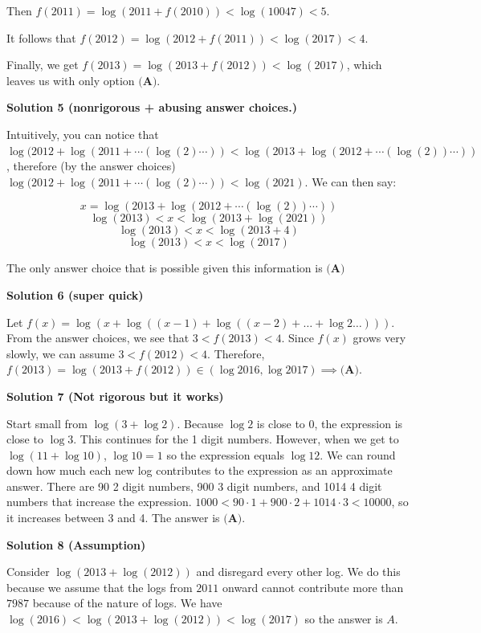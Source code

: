\begin{enumerate}
 Then $f(2011) = \log(2011+f(2010)) < \log(10047) < 5$. 

 It follows that $f(2012) = \log(2012+f(2011)) < \log(2017) < 4$. 

 Finally, we get $f(2013) = \log(2013 + f(2012)) < \log(2017)$, which leaves us with only option $\boxed{\textbf{(A)}}$.

 



\textbf{Solution 5 (nonrigorous + abusing answer choices.)}

Intuitively, you can notice that $\log(2012+\log(2011+\cdots(\log(2)\cdots))<\log(2013+\log(2012+\cdots(\log(2))\cdots))$, therefore (by the answer choices) $\log(2012+\log(2011+\cdots(\log(2)\cdots))<\log(2021)$. We can then say:

 
 \[x=\log(2013+\log(2012+\cdots(\log(2))\cdots))\]
 \[\log(2013)<x<\log(2013+\log(2021))\]
 \[\log(2013)<x<\log(2013+4)\]
 \[\log(2013)<x<\log(2017)\]

 The only answer choice that is possible given this information is $\boxed{\textbf{(A)}}$




\textbf{Solution 6 (super quick)}

Let $f(x) = \log(x + \log((x-1) + \log((x-2) + \ldots + \log 2 \ldots )))$. From the answer choices, we see that $3 < f(2013) < 4$. Since $f(x)$ grows very slowly, we can assume $3 < f(2012) < 4$. Therefore, $f(2013) = \log(2013 + f(2012)) \in (\log 2016, \log 2017) \implies \boxed{\textbf{(A)}}$.

 



\textbf{Solution 7 (Not rigorous but it works)}

Start small from $\log(3+\log2)$. Because $\log2$ is close to $0$, the expression is close to $\log 3$. This continues for the 1 digit numbers. However, when we get to $\log(11+\log10)$, $\log10=1$ so the expression equals $\log12$. We can round down how much each new log contributes to the expression as an approximate answer. There are 90 2 digit numbers, 900 3 digit numbers, and 1014 4 digit numbers that increase the expression. $1000< 90 \cdot 1 + 900 \cdot 2 + 1014 \cdot 3< 10000$, so it increases between 3 and 4. The answer is $\boxed{\textbf{(A)}}$. 

 



\textbf{Solution 8 (Assumption)}

Consider $\log (2013+\log(2012))$ and disregard every other log. We do this because we assume that the logs from $2011$ onward cannot contribute more than $7987$ because of the nature of logs. We have $\log(2016)<\log (2013+\log(2012))<\log(2017)$ so the answer is $\boxed{A}.$


\end{enumerate}
